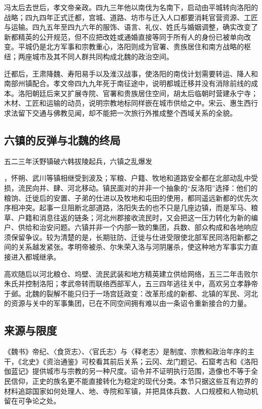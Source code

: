 冯太后去世后，孝文帝亲政。四九三年他以南伐为名南下，启动由平城转向洛阳的战略；\hypertarget{evt:NSL-440-589-086}{\textcolor{dynasty}{四九四年正式迁都}}，宫城、道路、坊市与迁入人口都要消耗官营资源、工匠与运输。四九五年至四九六年的服饰、语言、礼仪、姓氏与婚姻调整，确实改变了新都精英的公开规范，但不应把改姓或通婚直接等同于所有人的身份已被单向改变。平城仍是北方军事和宗教重心，洛阳则成为官署、贵族居住和南方战略的枢纽；两座城市及其不同人群共同构成北魏的政治空间。

迁都后，王肃降魏、寿阳易手以及淮汉战事，使洛阳的南伐计划需要转运、降人和南部州镇配合。孝文帝四九九年死于南征途中，说明都城迁移并没有消除前线的成本。洛阳朝廷后来又扩展寺院、官署和贵族居住空间，胡太后临朝时营建永宁寺；木材、工匠和运输的动员，说明宗教地标同样嵌在城市供给之中。宋云、惠生西行求法留下交通与佛教见闻，却不能把一次旅行外推成整个西域关系的全貌。

\subsection{六镇的反弹与北魏的终局}

\hypertarget{evt:NSL-440-589-139}{\textcolor{dynasty}{五二三年沃野镇破六韩拔陵起兵，六镇之乱爆发}}，怀朔、武川等镇相继受到波及；军粮、户籍、牧地和道路安全都在北部动乱中受损，流民向并、肆、河北移动。镇民面对的并非一个抽象的“反洛阳”选择：他们的粮饷、迁徙后的安置、子弟的仕进以及牧地和屯田的使用，都同遥远新都的优先次序相冲突。起事一旦阻断北部道路，洛阳失去的也不只是几座边镇，而是军马、粮草、户籍和消息往返的链条；河北州郡接收流民时，又会把这一压力转化为新的编户、供给和治安问题。六镇并非一个内部一致的集团，兵数、部众构成和各地响应须保留争议。较为清楚的是，长期驻防、迁徙与仕进受限使北部军民同洛阳新都之间的关系越发紧张。孝明帝被杀、尔朱荣入洛与河阴屠杀，使这种地方军事实力直接进入都城继承。

高欢随后以河北粮仓、坞壁、流民武装和地方精英建立供给网络，五三二年击败尔朱氏并控制洛阳；孝武帝转而联络西部军人，五三四年逃往关中，高欢另立孝静帝于邺。北魏的裂解不能只归于一场宫廷政变：改革形成的新都、北镇的军民、河北的资源与关中的军事集团，已在不同空间拥有难以由一条诏令重新接合的力量。

\subsection{来源与限度}

《魏书》帝纪、〈食货志〉、〈官氏志〉与〈释老志〉是制度、宗教和政治年序的主干，《北史》《资治通鉴》可校看其前后关系；云冈、龙门题记、石窟考古和《洛阳伽蓝记》提供城市与宗教的另一种尺度。诏令并不证明执行范围，造像也不等于全民信仰，正史的族名更不能直接转化为稳定的现代分类。本节只据这些互有边界的材料追踪国家如何处理人、地、寺院和军镇，并把具体兵数、人口规模和人物动机留在可争论之处。

